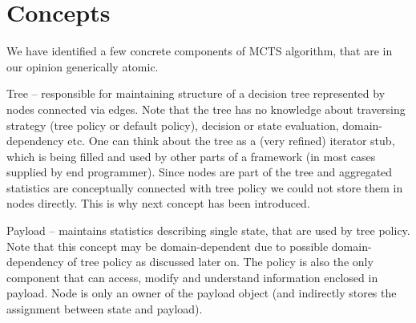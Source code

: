 \section{Concepts}
We have identified a few concrete components of MCTS algorithm, that are in our
opinion generically atomic.

Tree -- responsible for maintaining structure of a decision tree
represented by nodes connected via edges.
Note that the tree has no knowledge about traversing strategy (tree policy or
default policy), decision or state evaluation, domain-dependency etc. One can
think about the tree as a (very refined) iterator stub, which is being filled
and used by other parts of a framework (in most cases supplied by end
programmer).
Since nodes are part of the tree and aggregated statistics are conceptually
connected with tree policy we could not store them in nodes directly. This is
why next concept has been introduced.

Payload -- maintains statistics describing single state, that are used by tree
policy. Note that this concept may be domain-dependent due to possible
domain-dependency of tree policy as discussed later on. The policy is also the
only component that can access, modify and understand information enclosed in
payload. Node is only an owner of the payload object (and indirectly stores the
assignment between state and payload).

